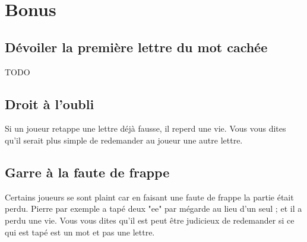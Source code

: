 \documentclass[12pt]{article}
\begin{document}
\section{Bonus}
\subsection{Dévoiler la première lettre du mot cachée}
TODO
\subsection{Droit à l'oubli}
Si un joueur retappe une lettre déjà fausse, il reperd une vie. Vous vous dites qu'il serait plus simple de redemander au joueur une autre lettre.

\subsection{Garre à la faute de frappe}
Certains joueurs se sont plaint car en faisant une faute de frappe la partie était perdu. Pierre par exemple a tapé deux "ee" par mégarde au lieu d'un seul ; et il a perdu une vie.
\newline Vous vous dites qu'il est peut être judicieux de redemander si ce qui est tapé est un mot et pas une lettre.
\end{document}
